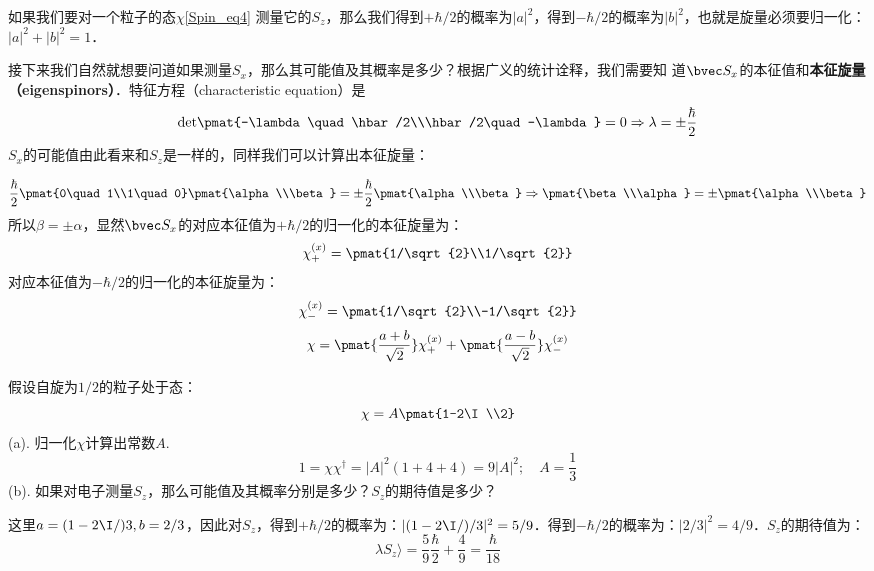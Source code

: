 如果我们要对一个粒子的态$\chi$\autoref{Spin_eq4} 测量它的$S_z$，那么我们得到$+\hbar/2$的概率为$|a|^2$，得到$-\hbar/2$的概率为$|b|^2$，也就是旋量必须要归一化：$|a|^2+ |b|^2 = 1$．

接下来我们自然就想要问道如果测量$S_x$，那么其可能值及其概率是多少？根据广义的统计诠释，我们需要知
道$\bvec S_x$的本征值和\textbf{本征旋量（eigenspinors）}．特征方程（characteristic equation）是
\begin{equation}
\rm{det}\pmat{-\lambda \quad \hbar/2\\\hbar/2\quad -\lambda}=0\Rightarrow\lambda=\pm\frac{\hbar}{2}
\end{equation}
$S_x$的可能值由此看来和$S_z$是一样的，同样我们可以计算出本征旋量：

\begin{equation}
\frac{\hbar}{2}\pmat{0\quad 1\\1\quad0}\pmat{\alpha\\\beta}=\pm\frac{\hbar}{2}\pmat{\alpha\\\beta} \Rightarrow \pmat{\beta\\\alpha}=\pm\pmat{\alpha\\\beta}
\end{equation}
所以$\beta=\pm\alpha$，显然$\bvec S_x$的对应本征值为$+\hbar/2$的归一化的本征旋量为：
\begin{equation}
\chi_+^{(x)}=\pmat{1/\sqrt{2}\\1/\sqrt{2}}
\end{equation}
对应本征值为$-\hbar/2$的归一化的本征旋量为：
\begin{equation}
\chi_-^{(x)}=\pmat{1/\sqrt{2}\\-1/\sqrt{2}}
\end{equation}
\begin{equation}
\chi = \pmat{\frac{a+b}{\sqrt{2}}}\chi_+^{(x)}+\pmat{\frac{a-b}{\sqrt{2}}}\chi_-^{(x)}
\end{equation}
\begin{example}{}
假设自旋为$1/2$的粒子处于态：
\begin{equation}
\chi = A\pmat{1-2\I\\2}
\end{equation}
(a). 归一化$\chi$计算出常数$A$.
\begin{equation}
1=\chi\chi^\dagger=|A|^2(1+4+4)=9|A|^2;\quad A=\frac{1}{3}
\end{equation}
(b). 如果对电子测量$S_z$，那么可能值及其概率分别是多少？$S_z$的期待值是多少？

这里$a=(1-2\I/)3,b=2/3$，因此对$S_z$，得到$+\hbar/2$的概率为：$|(1-2\I/)/3|^2=5/9$．得到$-\hbar/2$的概率为：$|2/3|^2=4/9$．$S_z$的期待值为：
\begin{equation}
\lambda S_z \rangle =\frac{5}{9}\frac{\hbar}{2}+\frac{4}{9}=\frac{\hbar}{18}
\end{equation}

\end{example}

